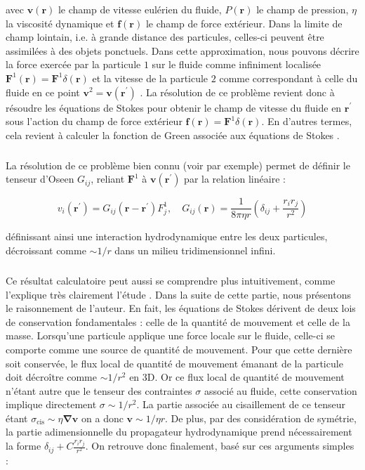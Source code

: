 \noindent avec $\mathbf{v}(\mathbf{r})$ le champ de vitesse eulérien du fluide, $P(\mathbf{r})$ le champ de pression, $\eta$ la viscosité dynamique et $\mathbf{f}(\mathbf{r})$ le champ de force extérieur. Dans la limite de champ lointain, i.e. à grande distance des particules, celles-ci peuvent être assimilées à des objets ponctuels. Dans cette approximation, nous pouvons décrire la force exercée par la particule $1$ sur le fluide comme infiniment localisée $\mathbf{F}^1(\mathbf{r}) = \mathbf{F}^1\delta (\mathbf{r})$ et la vitesse de la particule $2$ comme correspondant à celle du fluide en ce point $\mathbf{v}^2 = \mathbf{v}(\mathbf{r}^\prime)$ \cite{diamant_hydrodynamic_2009}. La résolution de ce problème revient donc à résoudre les équations de Stokes pour obtenir le champ de vitesse du fluide en $\mathbf{r}^\prime$ sous l'action du champ de force extérieur $\mathbf{f}(\mathbf{r}) = \mathbf{F}^1\delta (\mathbf{r})$. En d'autres termes, cela revient à calculer la fonction de Green associée aux équations de Stokes \cite{noauthor_physique_nodate}.

\subparagraph{}La résolution de ce problème bien connu (voir \cite{lisicki_four_2013} par exemple) permet de définir le tenseur d'Oseen $G_{ij}$, reliant $\mathbf{F}^1$ à $\mathbf{v}(\mathbf{r}^\prime)$ par la relation linéaire :

\begin{equation}
	v_i (\mathbf{r}^\prime) = G_{ij}(\mathbf{r} -\mathbf{r}^\prime)F^1_j, \quad G_{ij}(\mathbf{r}) = \frac{1}{8\pi\eta r}\left( \delta_{ij}+\frac{r_ir_j}{r^2} \right)
\end{equation}

\noindent définissant ainsi une interaction hydrodynamique entre les deux particules, décroissant comme $\sim 1/r$ dans un milieu tridimensionnel infini.

\subparagraph{}Ce résultat calculatoire peut aussi se comprendre plus intuitivement, comme l'explique très clairement l'étude \cite{diamant_hydrodynamic_2009}. Dans la suite de cette partie, nous présentons le raisonnement de l'auteur. En fait, les équations de Stokes dérivent de deux lois de conservation fondamentales : celle de la quantité de mouvement et celle de la masse. Lorsqu'une particule applique une force locale sur le fluide, celle-ci se comporte comme une source de quantité de mouvement. Pour que cette dernière soit conservée, le flux local de quantité de mouvement émanant de la particule doit décroître comme $\sim 1/r^2$ en 3D. Or ce flux local de quantité de mouvement n'étant autre que le tenseur des contraintes $\sigma$ associé au fluide, cette conservation implique directement $\sigma \sim 1/r^2$. La partie associée au cisaillement de ce tenseur étant $\sigma_\text{cis}\sim \eta \mathbf{\nabla} \mathbf{v}$ on a donc $\mathbf{v}\sim 1/\eta r$. De plus, par des considération de symétrie, la partie adimensionnelle du propagateur hydrodynamique prend nécessairement la forme $\delta_{ij}+C\frac{r_ir_j}{r^2}$. On retrouve donc finalement, basé sur ces arguments simples :

